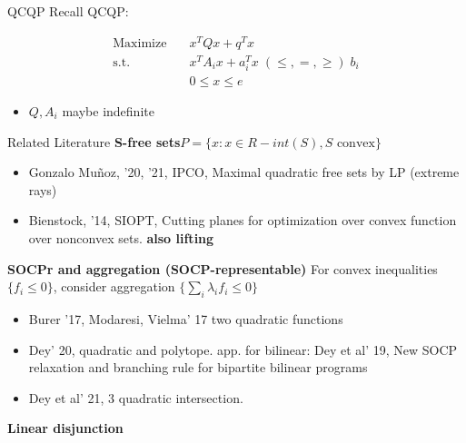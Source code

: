 

\usepackage{subfig}
\usepackage[style=authoryear]{biblatex}
\usepackage{bm}

\date{\today}


\subtitle{Strengthen SOCP relaxation}

\fontsize{9pt}{11}\selectfont
\frame{\titlepage}
\begin{frame}{QCQP}
  Recall QCQP:

  \begin{equation}
    \begin{aligned}
      \mathrm{Maximize}\quad & x^TQx + q^T x                                   \\
      \mathrm{s.t.}  \quad   & x^{T} A_i x  + a_i^Tx   \; (\le, =, \ge) \; b_i \\
                             & 0\le x\le e
    \end{aligned}
  \end{equation}

  \begin{itemize}
    \item \(Q, A_i\) maybe indefinite
  \end{itemize}
\end{frame}
\begin{frame}{Related Literature}
  \textbf{S-free sets}\(P = \{x: x \in R - int(S), S \text{ convex}\}\)
  \begin{itemize}
    \item[\xmark] Gonzalo Muñoz, '20, '21, IPCO, Maximal quadratic free sets by LP (extreme rays)
    \item Bienstock, '14, SIOPT, Cutting planes for optimization over convex function over nonconvex sets. \textbf{also lifting}
  \end{itemize}
  \textbf{SOCPr and aggregation (SOCP-representable)}
  For convex inequalities \(\{f_i \le 0\}\), consider aggregation \(\{\sum_i\lambda_i f_i \le 0 \}\)
  \begin{itemize}
    \item Burer '17, Modaresi, Vielma' 17 two quadratic functions
    \item Dey' 20, quadratic and polytope. app. for bilinear: Dey et al' 19, New SOCP relaxation and branching rule for bipartite bilinear programs
    \item Dey et al' 21, 3 quadratic intersection.
  \end{itemize}
  \textbf{Linear disjunction}
\end{frame}
